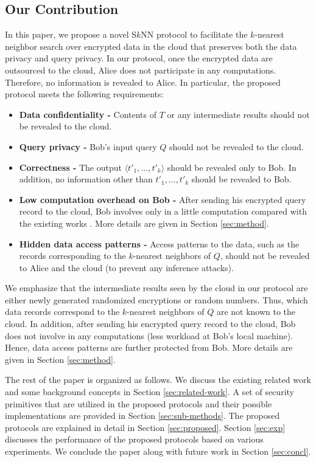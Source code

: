 \documentclass{article}
\begin{document}
\subsection{Our Contribution} 
In this paper, we propose a novel S$k$NN protocol to facilitate the $k$-nearest neighbor 
search over encrypted data in the cloud that preserves both the data privacy and query privacy. In our 
protocol, once the encrypted data are outsourced to the cloud, Alice does not participate in any 
computations. Therefore, no information is revealed to Alice. 
In particular, the proposed protocol meets the following requirements:
\begin{itemize}\itemsep=0pt
\item \textbf{Data confidentiality - } Contents of $T$ or any intermediate results should not be revealed to the cloud. 
\item \textbf{Query privacy - } Bob's input query $Q$ should not be revealed to the cloud.
\item  \textbf{Correctness - } The output $\langle t'_1,\dots,t'_k \rangle$ 
should be revealed only to Bob. In addition, no information other than $ t'_1,\dots,t'_k$ 
should be revealed to Bob.
\item \textbf{Low computation overhead on Bob - } After sending his encrypted 
query record to the cloud, Bob involves only in a little computation 
compared with the existing works \cite{wong2009secure,hu2011processing,yaosecure}. More details are 
given in Section \ref{sec:method}.
\item \textbf{Hidden data access patterns - } Access patterns to the data, such as 
the records corresponding to the $k$-nearest neighbors 
of $Q$, should 
not be revealed to Alice and the cloud (to prevent any inference attacks). 
\end{itemize}
We emphasize that the intermediate results seen by the cloud in our protocol 
are either newly generated randomized encryptions or 
random numbers. Thus, which data records 
correspond to the $k$-nearest neighbors of $Q$ are 
not known to the cloud.  In addition, after sending his encrypted 
query record to the cloud, Bob does not involve in any computations (less workload at Bob's local machine). Hence, 
data access patterns are further protected from Bob. More details are given in Section \ref{sec:method}.

The rest of the paper is organized as follows. 
We discuss the existing related work and some background concepts    
in Section \ref{sec:related-work}. A set of security primitives that are utilized 
in the proposed protocols and their possible implementations are provided in Section \ref{sec:sub-methods}. 
The proposed protocols are explained in detail in 
Section \ref{sec:proposed}. Section \ref{sec:exp} discusses the performance 
of the proposed protocols based on various experiments. We conclude the paper along 
with future work in Section \ref{sec:concl}.
\end{document}
